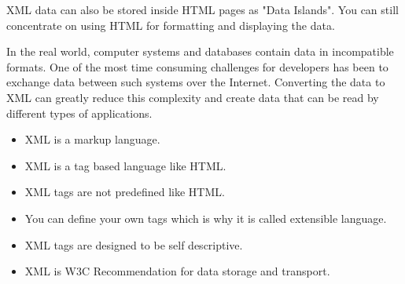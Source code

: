 \documentclass[10pt,a4paper]{article}
\begin{document}
\begin{itemize}
\begin{itemize}
XML data can also be stored inside HTML pages as "Data Islands". You can still concentrate on using HTML for formatting and displaying the data. 

In the real world, computer systems and databases contain data in incompatible formats. One of the most time consuming challenges for developers has been to exchange data between such systems over the Internet. Converting the data to XML can greatly reduce this complexity and create data that can be read by different types of applications.
	\begin{itemize}
	\item XML is a markup language.

    \item  XML is a tag based language like HTML.

    \item XML tags are not predefined like HTML.

    \item  You can define your own tags which is why it is called extensible language.

    \item XML tags are designed to be self descriptive.

     \item XML is W3C Recommendation for data storage and transport.
	\end{itemize}
	

	\end{itemize}
\end{itemize}

\newpage
\end{document}

